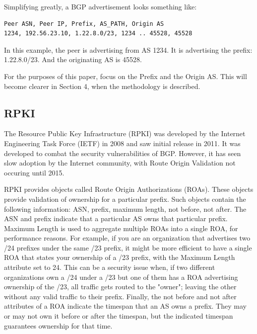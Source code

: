 Simplifying greatly, a BGP advertisement looks something like:

\vspace{10pt}

\begin{verbatim}
Peer ASN, Peer IP, Prefix, AS_PATH, Origin AS
1234, 192.56.23.10, 1.22.8.0/23, 1234 .. 45528, 45528
\end{verbatim}

\vspace{10pt}

In this example, the peer is advertising from AS 1234. It is advertising the
prefix: 1.22.8.0/23. And the originating AS is 45528.

For the purposes of this paper, focus on the Prefix and the Origin AS. This will
become clearer in Section 4, when the methodology is described.

\subsection{RPKI}
The Resource Public Key Infrastructure (RPKI) \cite{rpki-wiki} was developed by
the Internet Engineering Task Force (IETF) in 2008 and saw initial release in
2011. It was developed to combat the security vulnerabilities of BGP. However,
it has seen slow adoption by the Internet community, with Route Origin
Validation not occuring until 2015.

RPKI provides objects called Route Origin Authorizations (ROAs). These objects
provide validation of ownership for a particular prefix. Such objects contain
the following information: ASN, prefix, maximum length, not before, not after.
The ASN and prefix indicate that a particular AS owns that particular prefix.
Maximum Length is used to aggregate multiple ROAs into a single ROA, for
performance reasons. For example, if you are an organization that advertises two
/24 prefixes under the same /23 prefix, it might be more efficient to have a
single ROA that states your ownership of a /23 prefix, with the Maximum Length
attribute set to 24. This can be a security issue when, if two different
organizations own a /24 under a /23 but one of them has a ROA advertising
ownership of the /23, all traffic gets routed to the "owner"; leaving the other
without any valid traffic to their prefix. Finally, the not before and not after
attributes of a ROA indicate the timespan that an AS owns a prefix. They may or
may not own it before or after the timespan, but the indicated timespan
guarantees ownership for that time.

